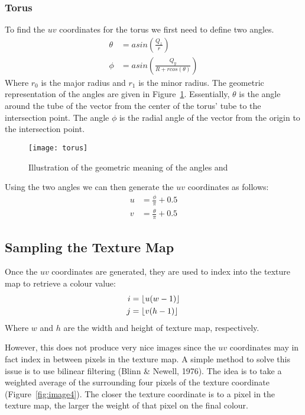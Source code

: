 \subsubsection*{Torus}
To find the $uv$ coordinates for the torus we first need to define two angles.
\begin{equation}
\begin{split}
  \theta &= asin(\frac{Q_{z}}{r}) \\
  \phi &= asin(\frac{Q_{y}}{R + rcos(\theta)})
\end{split}
\end{equation}
Where $r_{0}$ is the major radius and $r_{1}$ is the minor radius. The geometric
representation of the angles are given in Figure~\ref{fig:image3}. Essentially,
$\theta$ is the angle around the tube of the vector from the center of the 
torus' tube to the intersection point. The angle $\phi$ is the radial angle of
the vector from the origin to the intersection point.

\begin{figure}[ht]
  \texttt{[image: torus]}
  \caption{Illustration of the geometric meaning of the angles \theta and \phi}
  \label{fig:image3}
\end{figure}

Using the two angles we can then generate the $uv$ coordinates as follows:
\begin{equation}
\begin{split}
  u &= \frac{\phi}{\pi} + 0.5 \\
  v &= \frac{\theta}{\pi} + 0.5
\end{split}
\end{equation}

\subsection{Sampling the Texture Map}
Once the $uv$ coordinates are generated, they are used to index into the texture
map to retrieve a colour value:
\begin{equation}
\begin{split}
  i &= \floor*{u(w - 1)} \\
  j &= \floor*{v(h - 1)}
\end{split}
\end{equation}
Where $w$ and $h$ are the width and height of texture map, respectively.

However, this does not produce very nice images since the $uv$ coordinates may
in fact index in between pixels in the texture map. A simple method to solve
this issue is to use bilinear filtering (Blinn \& Newell, 1976). The idea is to
take a weighted average of the surrounding four pixels of the texture coordinate
(Figure~\ref{fig:image4}). The closer the texture coordinate is to a pixel in
the texture map, the larger the weight of that pixel on the final colour.


